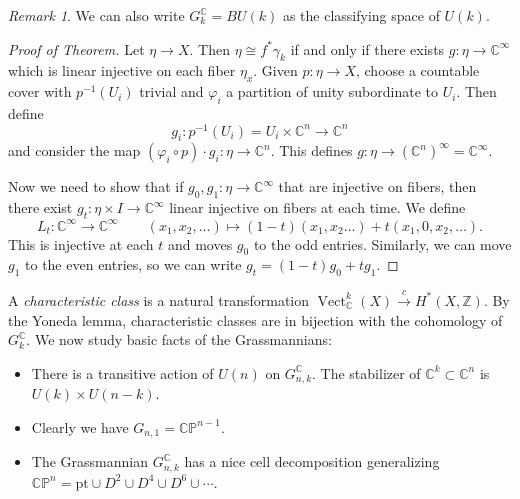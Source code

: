 \documentclass[leqno, openany]{memoir}
\theoremstyle{definition}
\theoremstyle{remark}
\newtheorem{rmk}[thm]{Remark}
\theoremstyle{plain}
\theoremstyle{definition}
\theoremstyle{remark}
\newcommand{\C}{\mathbb{C}}
\newcommand{\Z}{\mathbb{Z}}
\renewcommand{\P}{\mathbb{P}}
\newcommand{\mr}[1]{\mathrm{#1}}
\DeclareMathOperator{\Vect}{Vect}
\begin{document}
\begin{rmk}
    We can also write $G_k^{\C} = BU(k)$ as the classifying space of $U(k)$.
\end{rmk}

\begin{proof}[Proof of Theorem]
    Let $\eta \to X$. Then $\eta \cong f^* \gamma_k$ if and only if there exists $g \colon \eta \to \C^{\infty}$ which is linear injective on each fiber $\eta_x$. Given $p \colon \eta \to X$, choose a countable cover with $p^{-1}(U_i)$ trivial and $\varphi_i$ a partition of unity subordinate to $U_i$. Then define
    \[ g_i \colon p^{-1}(U_i) = U_i \times \C^n \to \C^n \]
    and consider the map $(\varphi_i \circ p) \cdot g_i \colon \eta \to \C^n$. This defines $g \colon \eta \to {(\C^n)}^{\infty} = \C^{\infty}$.

    Now we need to show that if $g_0, g_1 \colon \eta \to \C^{\infty}$ that are injective on fibers, then there exist $g_t \colon \eta \times I \to \C^{\infty}$ linear injective on fibers at each time. We define
    \[ L_t \colon \C^{\infty} \to \C^{\infty} \qquad (x_1, x_2, \ldots) \mapsto (1-t)(x_1, x_2 \ldots) + t (x_1, 0, x_2, \ldots). \]
    This is injective at each $t$ and moves $g_0$ to the odd entries. Similarly, we can move $g_1$ to the even entries, so we can write $g_t = (1-t) g_0 + t g_1$.
\end{proof}

A \textit{characteristic class} is a natural transformation $\Vect_{\C}^k (X) \xrightarrow{c} H^*(X, \Z)$. By the Yoneda lemma, characteristic classes are in bijection with the cohomology of $G_k^{\C}$. We now study basic facts of the Grassmannians:
\begin{itemize}
    \item There is a transitive action of $U(n)$ on $G_{n,k}^{\C}$. The stabilizer of $\C^k \subset \C^n$ is $U(k) \times U(n-k)$.
    \item Clearly we have $G_{n,1} = \C\P^{n-1}$.
    \item The Grassmannian $G_{n,k}^{\C}$ has a nice cell decomposition generalizing $\C\P^n = \mr{pt} \cup D^2 \cup D^4 \cup D^6 \cup \cdots$.
\end{itemize}
\end{document}
